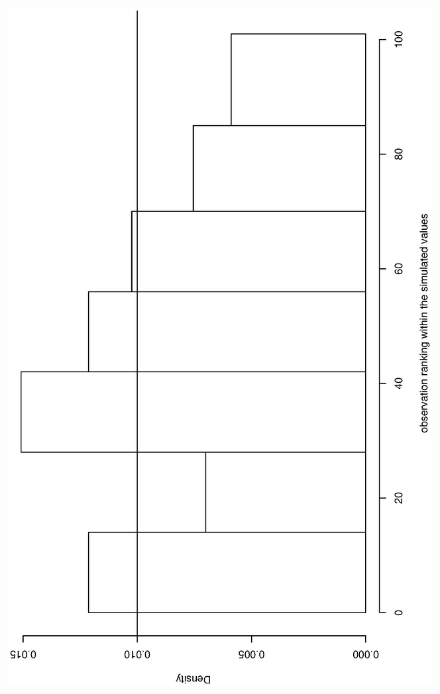 \documentclass[11pt, fleqn]{article}
\begin{document}
\begin{figure}[t]
\begin{center}
\begin{minipage}{8cm}
\includegraphics[scale=0.3, angle=-90]{pic/bm_pit_present.ps}
\end{minipage}
\hfill
\begin{minipage}{8cm}

\end{minipage}
\end{center}
\end{figure}
\end{document}
